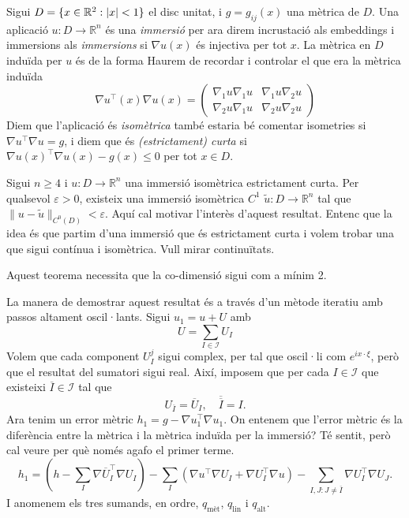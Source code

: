 Sigui $D=\{x\in\mathbb R^2 : |x|<1\}$ el disc unitat, i $g = g_{ij}(x)$ una mètrica de $D$. Una aplicació $u:D\to\mathbb R^n$ és una \textit{immersió} {\color{blue} per ara direm incrustació als embeddings i immersions als \textit{immersions}} si $\nabla u(x)$ és injectiva per tot $x$. La mètrica en $D$ induïda per $u$ és de la forma {\color{blue} Haurem de recordar i controlar el que era la mètrica induïda}
\begin{equation*}
    \nabla u ^{\intercal}(x)\nabla u (x) = \begin{pmatrix}
    \nabla_1 u\nabla_1 u & \nabla_1 u\nabla_2 u\\
    \nabla_2 u\nabla_1 u & \nabla_2 u\nabla_2 u
    \end{pmatrix}
\end{equation*}
Diem que l'aplicació és \textit{isomètrica} {\color{blue} també estaria bé comentar isometries} si $\nabla u ^{\intercal}\nabla u = g$, i diem que és \textit{(estrictament) curta} si $\nabla u(x)^{\intercal} \nabla u(x) - g(x) \le 0$ per tot $x\in D$.
\begin{teo}\label{Baby Nash}
    Sigui $n\ge 4$ i $u:D\to\mathbb R^n$ una immersió isomètrica estrictament curta. Per qualsevol $\varepsilon > 0$, existeix una immersió isomètrica $C^1$ $\tilde u:D\to\mathbb R^n$ tal que $\|u-\tilde u\|_{C^0(D)} < \varepsilon$.{\color{blue} Aquí cal motivar l'interès d'aquest resultat. Entenc que la idea és que partim d'una immersió que és estrictament curta i volem trobar una que sigui contínua i isomètrica. Vull mirar continuïtats.}
\end{teo}
\begin{obs}
    Aquest teorema necessita que la co-dimensió sigui com a mínim 2.
\end{obs}
La manera de demostrar aquest resultat és a través d'un mètode iteratiu amb passos altament oscil·lants.
Sigui $u_1 = u + U$ amb 
\begin{equation*}
    U=\sum_{I\in\mathcal I} U_I
\end{equation*}
Volem que cada component $U_I^j$ sigui complex, per tal que oscil·li com $e^{ix \cdot \xi}$, però que el resultat del sumatori sigui real. Així, imposem que per cada $I\in\mathcal I$ que existeixi $\overline I\in\mathcal I$ tal que 
\begin{equation*}
    U_{\overline{I}} = \overline{U}_I, \quad \overline{\overline{I}} = I.
\end{equation*}
Ara tenim un error mètric $h_1 = g - \nabla u_1 ^{\intercal}\nabla u_1$. {\color{blue} On entenem que l'error mètric és la diferència entre la mètrica i la mètrica induïda per la immersió? Té sentit, però cal veure per què només agafo el primer terme.}
\begin{equation*}
    h_1 = 
        \left( h-\sum_{I} \nabla \overline{U}_I ^{\intercal}\nabla U_I \right) 
        - \sum_{I}\left( \nabla u ^{\intercal}\nabla U_I + \nabla U_I ^{\intercal}\nabla u \right)
        - \sum_{I,J: J\not = \overline I} \nabla U_I ^{\intercal}\nabla U_J.
\end{equation*}
I anomenem els tres sumands, en ordre, $q_{\text{mèt}}$, $q_{\text{lin}}$ i $q_{\text{alt}}$.

